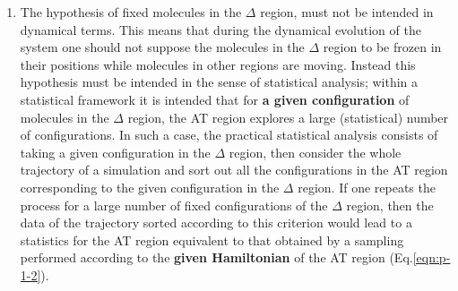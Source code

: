 \documentclass[aip,jcp,a4paper,reprint,onecolumn]{revtex4-1}
\newcommand{\redc}[1]{{\color{red} #1}}
\newcommand{\HY}{{\Delta}}
\begin{document}
\begin{enumerate}
\item \redc{The hypothesis of fixed molecules in the $\HY$ region, must not be intended in dynamical terms. This means that during the dynamical evolution of the system one should not suppose the molecules in the $\HY$ region to be frozen in their positions while molecules in other regions are moving. Instead this hypothesis must be intended in the sense of statistical analysis; within a statistical framework it is intended that for {\bf a given configuration} of molecules in the $\HY$ region, the AT region explores a large (statistical) number of configurations. In such a case, the practical statistical analysis consists of taking a given configuration in the $\HY$ region, then consider the whole trajectory of a simulation and sort out all the configurations in the AT region corresponding to the given configuration in the $\HY$ region. If one repeats the process for a large number of fixed configurations of the $\HY$ region, then the data of the trajectory sorted according to this criterion would lead to a statistics for the AT region equivalent to that obtained by a sampling performed according to the {\bf given Hamiltonian} of the AT region (Eq.\ref{eqn:p-1-2}).}

\end{enumerate}
\end{document}
